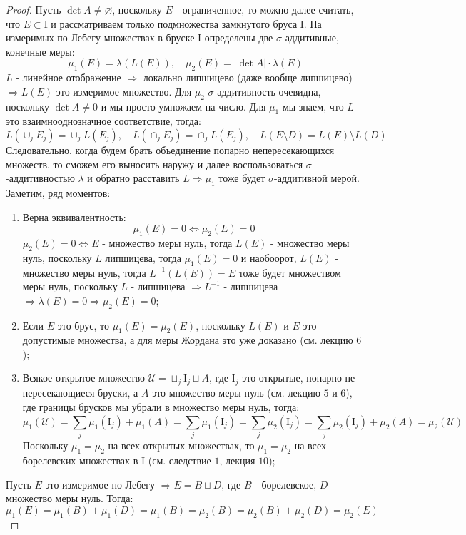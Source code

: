 \documentclass[12pt]{article}
\newcommand{\MI}{\mathrm{I}}
\newcommand{\MU}{\mathcal{U}}
\newcommand{\VN}{\varnothing}
\theoremstyle{definition}
\newcommand{\ddsum}[2]{\displaystyle\sum\limits_{#1}^{#2}}
\begin{document}
\begin{proof}
	Пусть $\det{A} \neq \VN$, поскольку $E$ - ограниченное, то можно далее считать, что $E\subset \MI$ и рассматриваем только подмножества замкнутого бруса $\MI$. На измеримых по Лебегу множествах в бруске $\MI$ определены две $\sigma$-аддитивные, конечные меры: 
	$$
		\mu_1(E) = \lambda(L(E)), \quad \mu_2(E) =|\det{A}|{\cdot}\lambda(E)
	$$
	$L$ - линейное отображение $\Rightarrow$ локально липшицево (даже вообще липшицево) $\Rightarrow L(E)$ это измеримое множество. Для $\mu_2$ $\sigma$-аддитивность очевидна, поскольку $\det{A} \neq 0$ и мы просто умножаем на число. Для $\mu_1$ мы знаем, что $L$ это взаимнооднозначное соответствие, тогда:
	$$
		L(\cup_j E_j) = \cup_j L(E_j), \quad L(\cap_j E_j) = \cap_j L(E_j), \quad L(E \setminus D) = L(E) \setminus L(D)
	$$
	Следовательно, когда будем брать объединение попарно непересекающихся множеств, то сможем его выносить наружу и далее воспользоваться $\sigma$-аддитивностью $\lambda$ и обратно расставить $L \Rightarrow \mu_1$ тоже будет $\sigma$-аддитивной мерой. Заметим, ряд моментов:
	\begin{enumerate}[label=\arabic*)]
		\item Верна эквивалентность:
		$$
			\mu_1(E) = 0 \Leftrightarrow \mu_2(E) = 0
		$$
		$\mu_2(E) = 0 \Leftrightarrow E$ - множество меры нуль, тогда $L(E)$ - множество меры нуль, поскольку $L$ липшицева, тогда $\mu_1(E) = 0$ и наобоорот, $L(E)$ - множество меры нуль, тогда $L^{-1}(L(E)) = E$ тоже будет множеством меры нуль, поскольку $L$ - липшицева $\Rightarrow L^{-1}$ - липшицева $\Rightarrow \lambda(E) = 0 \Rightarrow \mu_2(E) = 0$;
		\item Если $E$ это брус, то $\mu_1(E) = \mu_2(E)$, поскольку $L(E)$ и $E$ это допустимые множества, а для меры Жордана это уже доказано (см. лекцию $6$);
		\item Всякое открытое множество $\MU = \sqcup_j \MI_j \sqcup A$, где $\MI_j$ это открытые, попарно не пересекающиеся бруски, а $A$ это множество меры нуль (см. лекцию $5$ и $6$), где границы брусков мы убрали в множество меры нуль, тогда:
		$$
			\mu_1(\MU) = \ddsum{j}{}\mu_1(\MI_j) + \mu_1(A) = \ddsum{j}{}\mu_1(\MI_j) = \ddsum{j}{}\mu_2(\MI_j) = \ddsum{j}{}\mu_2(\MI_j) + \mu_2(A) = \mu_2(\MU)
		$$
		Поскольку $\mu_1 = \mu_2$ на всех открытых множествах, то $\mu_1 = \mu_2$ на всех борелевских множествах в $\MI$ (см. следствие $1$, лекция $10$);
	\end{enumerate}
	Пусть $E$ это измеримое по Лебегу $\Rightarrow E = B \sqcup D$, где $B$ - борелевское, $D$ - множество меры нуль. Тогда:
	$$
		\mu_1(E) = \mu_1(B) + \mu_1(D) = \mu_1(B) = \mu_2(B) = \mu_2(B) + \mu_2(D) = \mu_2(E)
	$$
\end{proof}
\end{document}
